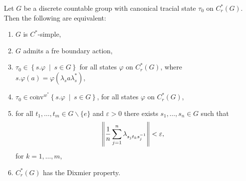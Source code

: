 \begin{theorem}
	Let $G$ be a discrete countable group with canonical tracial state $\tau_0$ on $C_r^*(G)$. Then the following are equivalent:
	\begin{enumerate}
		\item $G$ is $C^*$-simple,
		\item $G$ admits a fre boundary action,
		\item $\tau_0 \in \left\{ s.\varphi \ \mid \ s \in G \right\}$ for all states $\varphi $ on $C_r^*(G)$, where $s.\varphi(a) = \varphi(\lambda_s a \lambda_s^*)$,
		\item $\tau_0 \in \overline{\mathrm{conv}}^{w^*}\left\{ s . \varphi \ \mid \ s \in G \right\}$, for all states $\varphi$ on $C_r^*(G)$,
		\item for all $t_1,\dots,t_m \in G\backslash\{e\}$ and $\varepsilon > 0$ there exists $s_1,\dots,s_n \in G$ such that
			\begin{align*}
				\left\lVert \frac1n \sum_{j=1}^n \lambda_{s_jt_ks_j^{-1}}\right\rVert < \varepsilon,
			\end{align*}
			for $k=1,\dots,m$,
		\item $C_r^*(G)$ has the Dixmier property.
	\end{enumerate}
	\label{uffecsimple}
\end{theorem}

